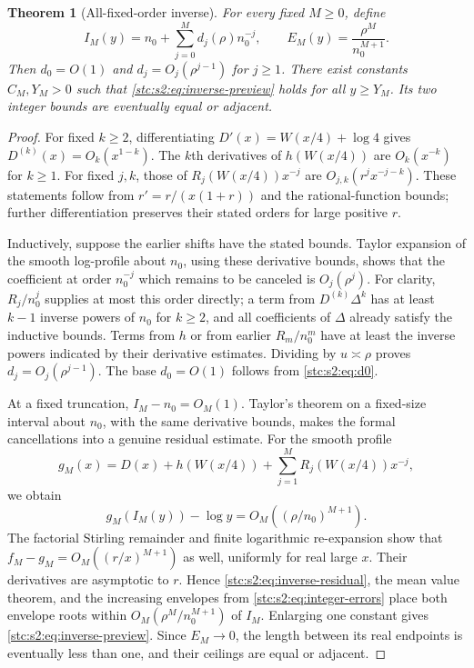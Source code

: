 \documentclass[11pt,letterpaper]{article}
\numberwithin{equation}{section}
\newtheorem{theorem}{Theorem}[section]
\theoremstyle{remark}\newtheorem{remark}[theorem]{Remark}
\begin{document}
\begin{theorem}[All-fixed-order inverse]\label{stc:s2:thm:inverse}
For every fixed $M\ge0$, define
\begin{equation}\label{stc:s2:eq:IM}
 I_M(y)=n_0+\sum_{j=0}^Md_j(\rho)n_0^{-j},
 \qquad E_M(y)=\frac{\rho^M}{n_0^{M+1}}.
\end{equation}
Then $d_0=O(1)$ and $d_j=O_j(\rho^{j-1})$ for $j\ge1$. There exist constants $C_M,Y_M>0$ such that \eqref{stc:s2:eq:inverse-preview} holds for all $y\ge Y_M$. Its two integer bounds are eventually equal or adjacent.
\end{theorem}
\begin{proof}
For fixed $k\ge2$, differentiating $D'(x)=W(x/4)+\log4$ gives $D^{(k)}(x)=O_k(x^{1-k})$. The $k$th derivatives of $h(W(x/4))$ are $O_k(x^{-k})$ for $k\ge1$. For fixed $j,k$, those of $R_j(W(x/4))x^{-j}$ are $O_{j,k}(r^jx^{-j-k})$. These statements follow from $r'=r/(x(1+r))$ and the rational-function bounds; further differentiation preserves their stated orders for large positive $r$.

Inductively, suppose the earlier shifts have the stated bounds. Taylor expansion of the smooth log-profile about $n_0$, using these derivative bounds, shows that the coefficient at order $n_0^{-j}$ which remains to be canceled is $O_j(\rho^j)$. For clarity, $R_j/n_0^j$ supplies at most this order directly; a term from $D^{(k)}\Delta^k$ has at least $k-1$ inverse powers of $n_0$ for $k\ge2$, and all coefficients of $\Delta$ already satisfy the inductive bounds. Terms from $h$ or from earlier $R_m/n_0^m$ have at least the inverse powers indicated by their derivative estimates. Dividing by $u\asymp\rho$ proves $d_j=O_j(\rho^{j-1})$. The base $d_0=O(1)$ follows from \eqref{stc:s2:eq:d0}.

At a fixed truncation, $I_M-n_0=O_M(1)$. Taylor's theorem on a fixed-size interval about $n_0$, with the same derivative bounds, makes the formal cancellations into a genuine residual estimate. For the smooth profile
\[
 g_M(x)=D(x)+h(W(x/4))+\sum_{j=1}^MR_j(W(x/4))x^{-j},
\]
we obtain
\begin{equation}\label{stc:s2:eq:inverse-residual}
 g_M(I_M(y))-\log y=O_M((\rho/n_0)^{M+1}).
\end{equation}
The factorial Stirling remainder and finite logarithmic re-expansion show that $f_M-g_M=O_M((r/x)^{M+1})$ as well, uniformly for real large $x$. Their derivatives are asymptotic to $r$. Hence \eqref{stc:s2:eq:inverse-residual}, the mean value theorem, and the increasing envelopes from \eqref{stc:s2:eq:integer-errors} place both envelope roots within $O_M(\rho^M/n_0^{M+1})$ of $I_M$. Enlarging one constant gives \eqref{stc:s2:eq:inverse-preview}. Since $E_M\to0$, the length between its real endpoints is eventually less than one, and their ceilings are equal or adjacent.
\end{proof}
\end{document}
